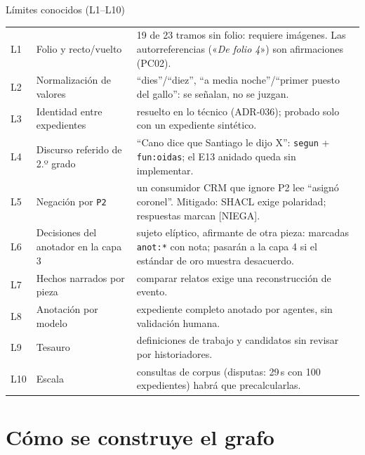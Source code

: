 \documentclass[aspectratio=169,10pt]{beamer}
\newcommand{\cita}[1]{«\textit{#1}»}
\newcommand{\ttt}[1]{\texttt{\small #1}}
\begin{document}
\begin{frame}{Límites conocidos (L1--L10)}
\scriptsize
\begin{tabular}{@{}p{0.5cm}p{3.3cm}p{9.4cm}@{}}
\toprule
L1 & Folio y recto/vuelto & 19 de 23 tramos sin folio: requiere imágenes. Las autorreferencias (\cita{De folio 4}) son afirmaciones (PC02). \\
L2 & Normalización de valores & \enquote{dies}/\enquote{diez}, \enquote{a media noche}/\enquote{primer puesto del gallo}: se \alert{señalan}, no se juzgan. \\
L3 & Identidad entre expedientes & resuelto en lo técnico (ADR-036); probado solo con un expediente sintético. \\
L4 & Discurso referido de 2.º grado & \enquote{Cano dice que Santiago le dijo X}: \ttt{segun} + \ttt{fun:oidas}; el E13 anidado queda sin implementar. \\
L5 & Negación por \ttt{P2} & un consumidor CRM que ignore P2 lee \enquote{asignó coronel}. Mitigado: SHACL exige polaridad; respuestas marcan [NIEGA]. \\
L6 & Decisiones del anotador en la capa 3 & sujeto elíptico, afirmante de otra pieza: marcadas \ttt{anot:*} con nota; pasarán a la capa 4 si el estándar de oro muestra desacuerdo. \\
L7 & Hechos narrados por pieza & comparar relatos exige una reconstrucción de evento. \\
L8 & Anotación por modelo & expediente completo anotado por agentes, sin validación humana. \\
L9 & Tesauro & definiciones de trabajo y candidatos sin revisar por historiadores. \\
L10 & Escala & consultas de corpus (disputas: 29\,s con 100 expedientes) habrá que precalcularlas. \\
\bottomrule
\end{tabular}
\end{frame}

\section{Cómo se construye el grafo}
\end{document}
